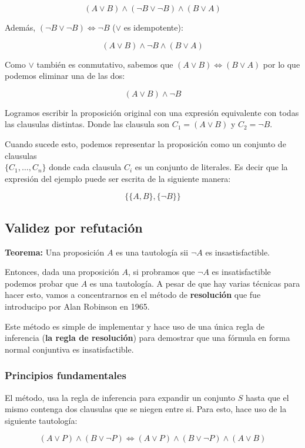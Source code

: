 $$(A\lor B)\land (\lnot B \lor \lnot B) \land (B\lor A)$$

Además, $(\lnot B \lor \lnot B) \iff \lnot B$ ($\lor$ es idempotente):

$$(A\lor B)\land \lnot B \land (B\lor A)$$

Como $\lor$ también es conmutativo, sabemos que $(A \lor B) \iff (B \lor A)$ por lo que podemos eliminar una de las dos:

$$(A\lor B)\land \lnot B$$

Logramos escribir la proposición original con una expresión equivalente con todas las clausulas distintas. Donde las clausula son $C_1 = (A\lor B)$ y $C_2 = \lnot B$.

Cuando sucede esto, podemos representar la proposición como un conjunto de clausulas \\ $\{C_1,\dots,C_n\}$ donde cada clausula $C_i$ es un conjunto de literales. Es decir que la expresión del ejemplo puede ser escrita de la siguiente manera:

$$\{\{A,B\},\{\lnot B\}\}$$

\subsection{Validez por refutación}

\textbf{Teorema:} Una proposición $A$ es una tautología sii $\lnot A$ es insastisfactible.

\vspace*{5mm}
Entonces, dada una proposición $A$, si probramos que $\lnot A$ es insatisfactible podemos probar que $A$ es una tautología. A pesar de que hay varias técnicas para hacer esto, vamos a concentrarnos en el método de \textbf{resolución} que fue introducipo por Alan Robinson en 1965.

Este método es simple de implementar y hace uso de una única regla de inferencia (\textbf{la regla de resolución}) para demostrar que una fórmula en forma normal conjuntiva es insatisfactible.

\subsubsection{Principios fundamentales}
El método, usa la regla de inferencia para expandir un conjunto $S$ hasta que el mismo contenga dos clausulas que se niegen entre si. Para esto, hace uso de la siguiente tautología: 

$$(A\lor P)\land (B\lor \lnot P) \iff (A\lor P)\land (B\lor \lnot P) \land (A \lor B)$$


